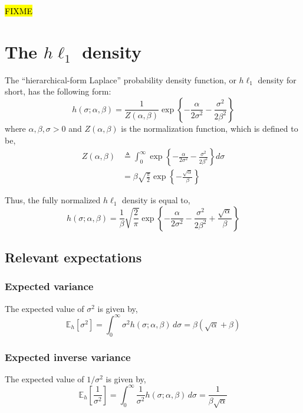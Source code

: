 \documentclass{article}
\newcommand{\E}[2]{\mathbb{E}_{#2}\left[ #1 \right]}
\begin{document}
\hl{FIXME}

\section{The $h\ell_1$ density}
\label{s:hprior}
The ``hierarchical-form Laplace'' probability density function,
or $h\ell_1$ density for short, has the following form:
\begin{equation}
h(\sigma; \alpha, \beta) =
 \frac{1}{Z(\alpha, \beta)}
 \exp\left\{
  -\frac{\alpha}{2 \sigma^2}
  -\frac{\sigma^2}{2 \beta^2}
 \right\}
\label{eq:hprior}
\end{equation}
where $\alpha, \beta, \sigma > 0$ and $Z(\alpha, \beta)$ is the
normalization function, which is defined to be,
\begin{equation}
\begin{aligned}
Z(\alpha, \beta) &\triangleq
 \int_0^\infty \exp\left\{
  -\frac{\alpha}{2 \sigma^2}
  -\frac{\sigma^2}{2 \beta^2}
 \right\} d\sigma
\\ &=
 \beta \sqrt{\frac{\pi}{2}}
 \exp\left\{ -\frac{\sqrt{\alpha}}{\beta} \right\}
\end{aligned}
\label{eq:hprior_z}
\end{equation}

Thus, the fully normalized $h\ell_1$ density is equal to,
\begin{equation}
h(\sigma; \alpha, \beta) =
 \frac{1}{\beta} \sqrt{\frac{2}{\pi}}
 \exp\left\{
  -\frac{\alpha}{2 \sigma^2}
  -\frac{\sigma^2}{2 \beta^2}
  +\frac{\sqrt{\alpha}}{\beta}
 \right\}
\label{eq:hprior_norm}
\end{equation}

\subsection{Relevant expectations}
\subsubsection{Expected variance}
The expected value of $\sigma^2$ is given by,
\begin{equation}
\E{\sigma^2}{h} =
 \int_0^\infty \sigma^2 h(\sigma; \alpha, \beta) \, d\sigma =
 \beta (\sqrt{\alpha} + \beta)
\label{eq:expect_s2}
\end{equation}

\subsubsection{Expected inverse variance}
The expected value of $1 / \sigma^2$ is given by,
\begin{equation}
\E{\frac{1}{\sigma^2}}{h} =
 \int_0^\infty \frac{1}{\sigma^2} h(\sigma; \alpha, \beta) \, d\sigma =
 \frac{1}{\beta \sqrt{\alpha}}
\label{eq:expect_s2_inv}
\end{equation}
\end{document}
